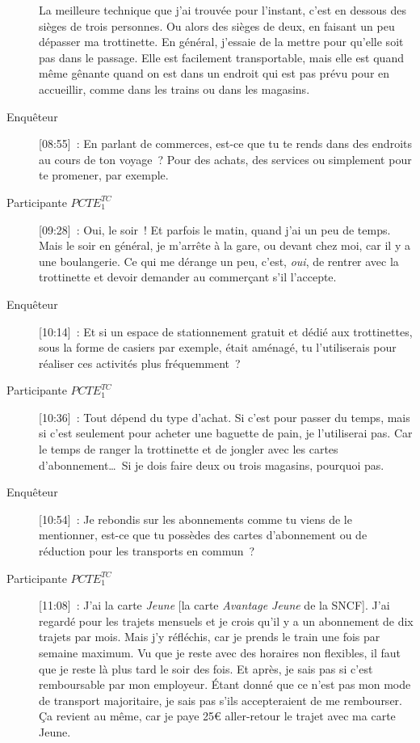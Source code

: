 \begin{description}
    La meilleure technique que j’ai trouvée pour l’instant, c’est en dessous des sièges de trois personnes. Ou alors des sièges de deux, en faisant un peu dépasser ma trottinette. En général, j’essaie de la mettre pour qu’elle soit pas dans le passage. Elle est facilement transportable, mais elle est quand même gênante quand on est dans un endroit qui est pas prévu pour en accueillir, comme dans les trains ou dans les magasins.
    \item[Enquêteur] [08:55]~: En parlant de commerces, est-ce que tu te rends dans des endroits au cours de ton voyage~? Pour des achats, des services ou simplement pour te promener, par exemple.
    \item[Participante \(PCTE^{TC}_{1}\)] [09:28]~: Oui, le soir~! Et parfois le matin, quand j'ai un peu de temps. Mais le soir en général, je m'arrête à la gare, ou devant chez moi, car il y a une boulangerie. Ce qui me dérange un peu, c’est, \textsl{oui}, de rentrer avec la trottinette et devoir demander au commerçant s’il l’accepte.
    \item[Enquêteur] [10:14]~: Et si un espace de stationnement gratuit et dédié aux trottinettes, sous la forme de casiers par exemple, était aménagé, tu l'utiliserais pour réaliser ces activités plus fréquemment~?
    \item[Participante \(PCTE^{TC}_{1}\)] [10:36]~: Tout dépend du type d’achat. Si c’est pour passer du temps, mais si c’est seulement pour acheter une baguette de pain, je l’utiliserai pas. Car le temps de ranger la trottinette et de jongler avec les cartes d'abonnement\dots~Si je dois faire deux ou trois magasins, pourquoi pas.
    \item[Enquêteur] [10:54]~: Je rebondis sur les abonnements comme tu viens de le mentionner, est-ce que tu possèdes des cartes d'abonnement ou de réduction pour les transports en commun~?
    \item[Participante \(PCTE^{TC}_{1}\)] [11:08]~: J’ai la carte \textsl{Jeune} [la carte \textsl{Avantage Jeune} de la SNCF]. J’ai regardé pour les trajets mensuels et je crois qu’il y a un abonnement de dix trajets par mois. Mais j’y réfléchis, car je prends le train une fois par semaine maximum. Vu que je reste avec des horaires non flexibles, il faut que je reste là plus tard le soir des fois. Et après, je sais pas si c’est remboursable par mon employeur. Étant donné que ce n’est pas mon mode de transport majoritaire, je sais pas s’ils accepteraient de me rembourser. Ça revient au même, car je paye 25€ aller-retour le trajet avec ma carte Jeune.

\end{description}

